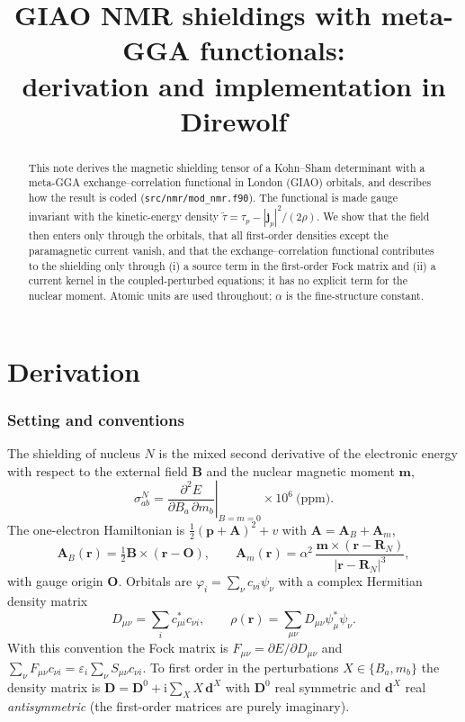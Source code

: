 \documentclass[11pt,a4paper]{article}
\title{GIAO NMR shieldings with meta-GGA functionals:\\derivation and implementation in Direwolf}
\author{}
\date{}
\newcommand{\rr}{\bm{r}}
\newcommand{\jp}{\bm{j}_p}
\newcommand{\ttil}{\tilde\tau}
\newcommand{\Dm}{\mathbf{D}}
\newcommand{\ci}{\mathrm{i}}
\begin{document}
\maketitle
\tableofcontents

\begin{abstract}
\noindent
This note derives the magnetic shielding tensor of a Kohn--Sham determinant with a meta-GGA exchange--correlation functional in London (GIAO) orbitals, and describes how the result is coded (\texttt{src/nmr/mod\_nmr.f90}). The functional is made gauge invariant with the kinetic-energy density $\ttil=\tau_p-|\jp|^2/(2\rho)$. We show that the field then enters only through the orbitals, that all first-order densities except the paramagnetic current vanish, and that the exchange--correlation functional contributes to the shielding only through (i) a source term in the first-order Fock matrix and (ii) a current kernel in the coupled-perturbed equations; it has no explicit term for the nuclear moment. Atomic units are used throughout; $\alpha$ is the fine-structure constant.
\end{abstract}

\part{Derivation}

\section{Setting and conventions}

The shielding of nucleus $N$ is the mixed second derivative of the electronic energy with respect to the external field $\bm B$ and the nuclear magnetic moment $\bm m$,
\begin{equation}
\sigma^N_{ab}=\left.\frac{\partial^2E}{\partial B_a\,\partial m_b}\right|_{B=m=0}\times10^{6}\ \text{(ppm)} .
\end{equation}
The one-electron Hamiltonian is $\tfrac12(\bm p+\bm A)^2+v$ with $\bm A=\bm A_B+\bm A_m$,
\begin{equation}
\bm A_B(\rr)=\tfrac12\bm B\times(\rr-\bm O),\qquad
\bm A_m(\rr)=\alpha^2\,\frac{\bm m\times(\rr-\bm R_N)}{|\rr-\bm R_N|^3},
\end{equation}
with gauge origin $\bm O$. Orbitals are $\varphi_i=\sum_\nu c_{\nu i}\psi_\nu$ with a complex Hermitian density matrix
\begin{equation}
D_{\mu\nu}=\sum_i c^*_{\mu i}c_{\nu i},\qquad
\rho(\rr)=\sum_{\mu\nu}D_{\mu\nu}\psi_\mu^*\psi_\nu .
\label{eq:rho}
\end{equation}
With this convention the Fock matrix is $F_{\mu\nu}=\partial E/\partial D_{\mu\nu}$ and $\sum_\nu F_{\mu\nu}c_{\nu i}=\varepsilon_i\sum_\nu S_{\mu\nu}c_{\nu i}$.
To first order in the perturbations $X\in\{B_a,m_b\}$ the density matrix is $\Dm=\Dm^0+\ci\sum_X X\,\bm d^X$ with $\Dm^0$ real symmetric and $\bm d^X$ real \emph{antisymmetric} (the first-order matrices are purely imaginary).
\end{document}
